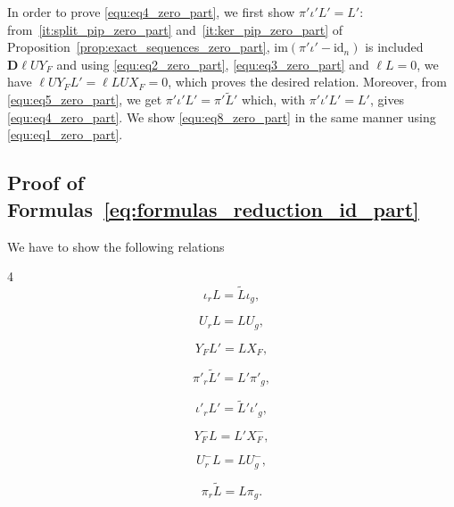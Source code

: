 \documentclass[10pt]{article}
\newenvironment{changemargin}[2]{\begin{list}{}{%
      \setlength{\topsep}{0pt}%
      \setlength{\leftmargin}{0pt}%
      \setlength{\rightmargin}{0pt}%
      \setlength{\listparindent}{\parindent}%
      \setlength{\itemindent}{\parindent}%
      \setlength{\parsep}{0pt plus 1pt}%
      \addtolength{\leftmargin}{#1}%
      \addtolength{\rightmargin}{#2}%
    }\item }{\end{list}}
\newcommand\g[1]{\textbf{#1}}
\newcommand\id[1]{\text{id}_{#1}}
\newcommand\im[1]{\text{im}\left(#1\right)}
\newcommand\D{\g{D}}
\begin{document}
In order to prove \eqref{equ:eq4_zero_part}, we first show $\pi'\iota'L'=
L'$: from~\ref{it:split_pip_zero_part} and~\ref{it:ker_pip_zero_part} of
Proposition~\ref{prop:exact_sequences_zero_part}, $\im{\pi'\iota'-\id{n}}
$ is included $\D\ell UY_F$ and using \eqref{equ:eq2_zero_part},
\eqref{equ:eq3_zero_part} and $\ell L=0$, we have $\ell UY_FL'=\ell LUX_F
=0$, which proves the desired relation. Moreover, from
\eqref{equ:eq5_zero_part}, we get $\pi'\iota'L'=\pi'\tilde{L}'$ which,
with $\pi'\iota'L'=L'$, gives \eqref{equ:eq4_zero_part}. We show
\eqref{equ:eq8_zero_part} in the same manner using
\eqref{equ:eq1_zero_part}.

\subsection{Proof of Formulas~\ref{eq:formulas_reduction_id_part}}
\label{sec:proofs_reduction_id_part}

We have to show the following relations

\begin{changemargin}{-1.5cm}{0cm}
  \begin{multicols}{4}
    \begin{equation}\label{equ:eq1_id_part}
      \iota_rL=\tilde{L}\iota_g,
    \end{equation}
    
    \begin{equation}\label{equ:eq2_id_part}
      U_rL=LU_g,
    \end{equation}
    
    \begin{equation}\label{equ:eq3_id_part}
      Y_FL'=LX_F,
    \end{equation}
    
    \begin{equation}\label{equ:eq4_id_part}
      \pi'_r\tilde{L}'=L'\pi'_g,
    \end{equation}
    
    \begin{equation}\label{equ:eq5_id_part}
      \iota'_rL'=\tilde{L}'\iota'_g,
    \end{equation}
    
    \begin{equation}\label{equ:eq6_id_part}
      Y_F^-L=L'X_F^-,
    \end{equation}
    
    \begin{equation}\label{equ:eq7_id_part}
      U_r^-L=LU_g^-, 
    \end{equation}
    
    \begin{equation}\label{equ:eq8_id_part}
      \pi_r\tilde{L}=L\pi_g.
    \end{equation}
  \end{multicols}
\end{changemargin}
\end{document}
